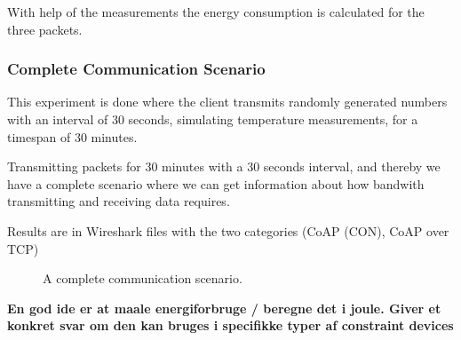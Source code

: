 With help of the measurements the energy consumption is calculated for the three packets.


\subsubsection{Complete Communication Scenario}
This experiment is done where the client transmits randomly generated numbers with an interval of 30 seconds, simulating temperature measurements, for a timespan of 30 minutes.

Transmitting packets for 30 minutes with a 30 seconds interval, and thereby we have a complete scenario where we can get information about how bandwith transmitting and receiving data requires.

Results are in Wireshark files with the two categories (CoAP (CON), CoAP over TCP)
\begin{figure}[!t]
	\caption{A complete communication scenario.}
	\label{fig:completescenario}
\end{figure}


\textbf{En god ide er at maale energiforbruge / beregne det i joule. Giver et konkret svar om den kan bruges i specifikke typer af constraint devices}


